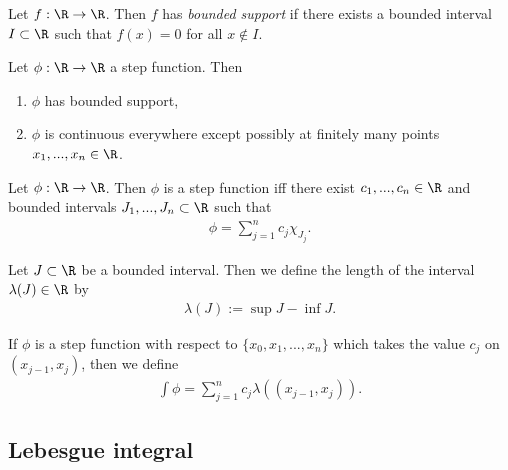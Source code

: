 \documentclass{article}
\begin{document}
\begin{definition}
	Let $f:\R\to\R$. Then $f$ has \emph{bounded support} if there exists a bounded
	interval $I\subset\R$ such that $f(x)=0$ for all $x\not\in I$.
\end{definition}

\begin{lemma}
	Let $\phi:\R\to\R$ a step function. Then
	\begin{enumerate}
		\item $\phi$ has bounded support,
		\item $\phi$ is continuous everywhere except possibly at finitely many points
		      $x_1,...,x_n\in\R$.
	\end{enumerate}
\end{lemma}

\begin{lemma}[Example 4.2]
	Let $\phi:\R\to\R$. Then $\phi$ is a step function iff there exist $c_1,...,c_n\in\R$
	and bounded intervals $J_1,...,J_n\subset\R$ such that
	\begin{align*}
		\phi = \sum_{j=1}^n c_j\chi_{J_j}.
	\end{align*}
\end{lemma}

\begin{definition}
	Let $J\subset\R$ be a bounded interval. Then we define the length of the interval $\lambda(J)\in\R$ by
	\begin{align*}
		\lambda(J) := \sup J - \inf J.
	\end{align*}
\end{definition}

\begin{definition}
	\label{step_integration}
	If $\phi$ is a step function with respect to $\{x_0, x_1, ..., x_n\}$ which takes the
	value $c_j$ on $(x_{j-1}, x_j)$, then we define
	\begin{align*}
		\int \phi = \sum_{j=1}^n c_j\lambda((x_{j-1},x_j)).
	\end{align*}
\end{definition}

\subsection{Lebesgue integral}
\end{document}
